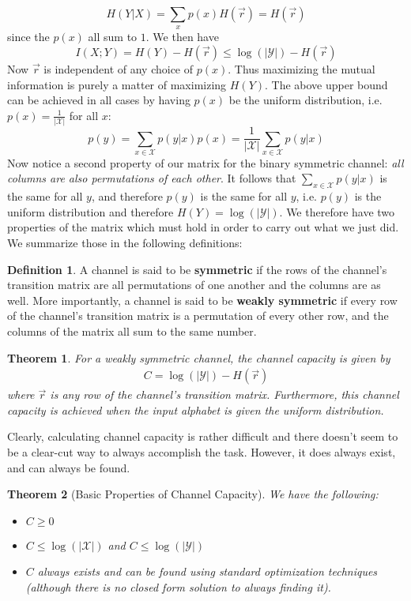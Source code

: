 \documentclass{article}
\theoremstyle{definition}
\newtheorem{definition}{Definition}[section]
\theoremstyle{plain}
\newtheorem{theorem}{Theorem}[section]
\begin{document}
\[ H(Y|X) = \sum_x p(x)H(\vec{r}) = H(\vec{r}) \]
since the $p(x)$ all sum to $1$. We then have 
\[ I(X;Y) = H(Y) - H(\vec{r}) \leq \log(|\mathcal{Y}|) - H(\vec{r}) \]
Now $\vec{r}$ is independent of any choice of $p(x)$. Thus maximizing the mutual information is purely a matter of maximizing $H(Y)$. The above upper bound can be achieved in all cases by having $p(x)$ be the uniform distribution, i.e. $p(x) = \frac{1}{|\mathcal{X}|}$ for all $x$:
\[ p(y) = \sum_{x \in \mathcal{X}} p(y|x)p(x) = \frac{1}{|\mathcal{X}|}\sum_{x \in \mathcal{X}}p(y|x) \]
Now notice a second property of our matrix for the binary symmetric channel: \emph{all columns are also permutations of each other}. It follows that $\sum_{x \in \mathcal{X}}p(y|x)$ is the same for all $y$, and therefore $p(y)$ is the same for all $y$, i.e. $p(y)$ is the uniform distribution and therefore $H(Y) = \log(|\mathcal{Y}|)$. We therefore have two properties of the matrix which must hold in order to carry out what we just did. We summarize those in the following definitions:
\begin{definition}
	A channel is said to be \textbf{symmetric} if the rows of the channel's transition matrix are all permutations of one another and the columns are as well. More importantly, a channel is said to be \textbf{weakly symmetric} if every row of the channel's transition matrix is a permutation of every other row, and the columns of the matrix all sum to the same number.  
\end{definition}
\begin{theorem}
	For a weakly symmetric channel, the channel capacity is given by 
	\begin{align}
		C = \log(|\mathcal{Y}|) - H(\vec{r})
	\end{align}
	where $\vec{r}$ is any row of the channel's transition matrix. Furthermore, this channel capacity is achieved when the input alphabet is given the uniform distribution. 
\end{theorem}
Clearly, calculating channel capacity is rather difficult and there doesn't seem to be a clear-cut way to always accomplish the task. However, it does always exist, and can always be found. 
\begin{theorem}[Basic Properties of Channel Capacity]
We have the following:
	\begin{itemize}
		\item[(1)] $C \geq 0$
		\item[(2)] $C \leq \log(|\mathcal{X}|)$ and $C \leq \log(|\mathcal{Y}|)$
		\item[(3)] $C$ always exists and can be found using standard optimization techniques (although there is no closed form solution to always finding it). 
	\end{itemize}
\end{theorem} 
\end{document}
